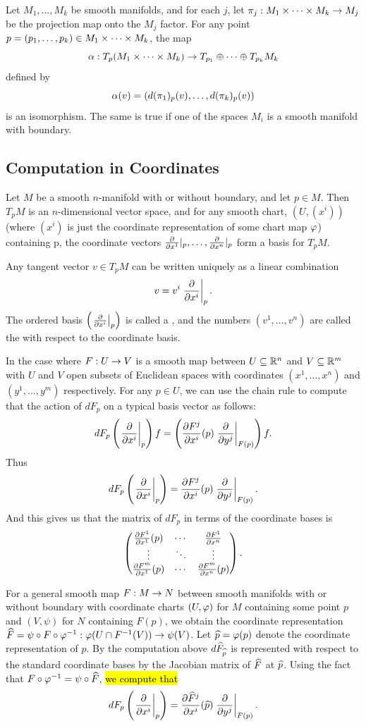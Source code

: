 \begin{prop}
Let $M_1,\ldots,M_k$ be smooth manifolds, and for each $j$, let $\pi_j:M_1\times\cdots\times M_k\rightarrow M_j$ be the projection map onto the $M_j$ factor. For any point $p = (p_1,\ldots,p_k)\in M_1\times\cdots\times M_k$, the map
\[\alpha:T_p(M_1\times\cdots\times M_k)\rightarrow T_{p_1} \oplus \cdots \oplus T_{p_k}M_k\]
defined by
\[\alpha(v) = (d(\pi_1)_p(v),\ldots,d(\pi_k)_p(v))\]
is an isomorphism. The same is true if one of the spaces $M_i$ is a smooth manifold with boundary.
\end{prop}

\subsection{Computation in Coordinates}\nl

\begin{prop}
Let $M$ be a smooth $n$-manifold with or without boundary, and let $p\in M$. Then $T_p M$ is an $n$-dimensional vector space, and for any smooth chart, $(U, (x^i))$ (where $(x^i)$ is just the coordinate representation of some chart map $\varphi$) containing p, the coordinate vectors $\frac{\partial}{\partial x^1}|_p,\ldots,\frac{\partial}{\partial x^n}|_p$ form a basis for $T_pM$.
\end{prop}

\dfn Any tangent vector $v\in T_pM$ can be written uniquely as a linear combination
\[v = v^i\left. \frac{\partial}{\partial x^i}\right|_{p}.\]
The ordered basis $\left(\left. \frac{\partial}{\partial x^i}\right|_{p}\right)$ is called a , and the numbers $(v^1,\ldots,v^n)$ are called the  with respect to the coordinate basis.

\dfn In the case where $F:U\rightarrow V$ is a smooth map between $U\subseteq \mathbb{R}^n$ and $V\subseteq \mathbb{R}^m$ with $U$ and $V$ open subsets of Euclidean spaces with coordinates $(x^1,\ldots,x^n)$ and $(y^1,\ldots, y^m)$ respectively. For any $p\in U$, we can use the chain rule to compute that the action of $dF_p$ on a typical basis vector as follows:
\[dF_p\left( \left. \frac{\partial}{\partial x^i}\right|_{p}\right) f = \left(\frac{\partial{F^j}}{\partial{x^i}}(p) \left. \frac{\partial}{\partial y^j}\right|_{F(p)}\right) f.\]
Thus
\[dF_p\left( \left. \frac{\partial}{\partial x^i}\right|_{p}\right) = \frac{\partial{F^j}}{\partial{x^i}}(p) \left. \frac{\partial}{\partial y^j}\right|_{F(p)}.\]
And this gives us that the matrix of $dF_p$ in terms of the coordinate bases is
\[\begin{pmatrix} \frac{\partial{F^1}}{\partial{x^1}}(p) & \cdots & \frac{\partial{F^1}}{\partial{x^n}}\\
       \vdots & \ddots & \vdots\\
       \frac{\partial{F^m}}{\partial{x^1}}(p) & \cdots & \frac{\partial{F^m}}{\partial{x^n}}(p)\end{pmatrix}.\]

\dfn For a general smooth map $F:M\rightarrow N$ between smooth manifolds with or without boundary with coordinate charts $(U,\varphi)$ for $M$ containing some point $p$ and $(V, \psi)$ for $N$ containing $F(p)$, we obtain the coordinate representation $\widehat F = \psi \circ F \circ \varphi^{-1}:\varphi(U\cap F^{-1}(V))\rightarrow \psi(V)$. Let $\widehat p = \varphi(p)$ denote the coordinate representation of $p$. By the computation above $d\widehat F_{\widehat p}$ is represented with respect to the standard coordinate bases by the Jacobian matrix of $\widehat F$ at $\widehat p$. Using the fact that $F\circ \varphi^{-1} = \psi \circ \widehat F$, \hl{we compute that}
\[dF_p\left(\left. \frac{\partial}{\partial x^i}\right|_{p}\right) = \frac{\partial{\widehat F^j}}{\partial{x^i}}(\widehat p)\left. \frac{\partial}{\partial y^j}\right|_{F(p)}.\]

